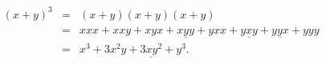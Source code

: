 ${\begin{eqnarray}(x+y)^{3}&=&(x+y)(x+y)(x+y)\\&=&xxx+xxy+xyx+{\underline {xyy}}+yxx+{\underline {yxy}}+{\underline {yyx}}+yyy\\&=&x^{3}+3x^{2}y+{\underline {3xy^{2}}}+y^{3}.\end{eqnarray}}$